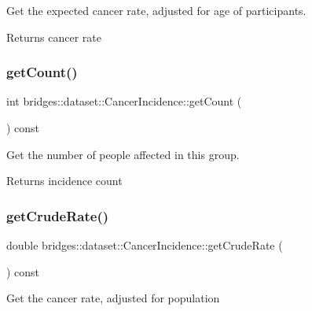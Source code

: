 Get the expected cancer rate, adjusted for age of participants.

\begin{DoxyReturn}{Returns}
cancer rate 
\end{DoxyReturn}
\mbox{\label{classbridges_1_1dataset_1_1_cancer_incidence_a3841428ae70cac0663153d22a46080df}} 
\subsubsection{\texorpdfstring{get\+Count()}{getCount()}}
{\footnotesize\ttfamily int bridges\+::dataset\+::\+Cancer\+Incidence\+::get\+Count (\begin{DoxyParamCaption}{ }\end{DoxyParamCaption}) const\hspace{0.3cm}{\ttfamily [inline]}}



Get the number of people affected in this group. 

\begin{DoxyReturn}{Returns}
incidence count 
\end{DoxyReturn}
\mbox{\label{classbridges_1_1dataset_1_1_cancer_incidence_aee79da5ad2ce63e44f4400276cc78f63}} 
\subsubsection{\texorpdfstring{get\+Crude\+Rate()}{getCrudeRate()}}
{\footnotesize\ttfamily double bridges\+::dataset\+::\+Cancer\+Incidence\+::get\+Crude\+Rate (\begin{DoxyParamCaption}{ }\end{DoxyParamCaption}) const\hspace{0.3cm}{\ttfamily [inline]}}

Get the cancer rate, adjusted for population

